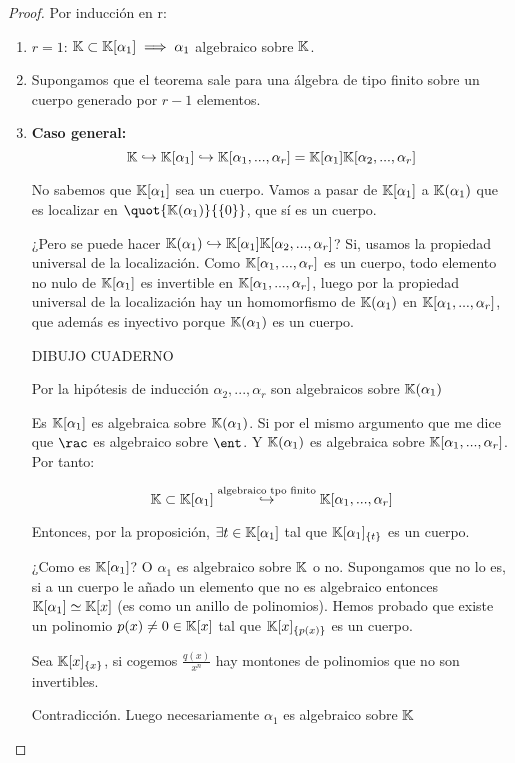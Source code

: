 \begin{proof}
	Por inducción en r:
	\begin{enumerate}
		\item $r=1$: $\mathbb{K} \subset \mathbb{K}[\alpha_1] \implies \alpha_1$ algebraico sobre $\mathbb{K}$.
		\item Supongamos que el teorema sale para una álgebra de tipo finito sobre un cuerpo generado por $r-1$ elementos.
		\item \textbf{Caso general:}
		$$\mathbb{K} \hookrightarrow \mathbb{K}[\alpha_1] \hookrightarrow \mathbb{K}[\alpha_1,...,\alpha_r]=\mathbb{K}[\alpha_1]\mathbb{K}[\alpha_2,...,\alpha_r]$$
		
		No sabemos que $\mathbb{K}[\alpha_1]$ sea un cuerpo. Vamos a pasar de $\mathbb{K}[\alpha_1]$ a $\mathbb{K}(\alpha_1)$ que es localizar en $\quot{\K(\alpha_1)}{\{0\}}$, que sí es un cuerpo.
		
		¿Pero se puede hacer $\mathbb{K}(\alpha_1) \hookrightarrow \mathbb{K}[\alpha_1]\mathbb{K}[\alpha_2,...,\alpha_r]$?  Si, usamos la propiedad universal de la localización. Como $\mathbb{K}[\alpha_1,...,\alpha_r]$ es un cuerpo, todo elemento no nulo de $\mathbb{K}[\alpha_1]$ es invertible en $\mathbb{K}[\alpha_1,...,\alpha_r]$, luego por la propiedad universal de la localización hay un homomorfismo de $\mathbb{K}(\alpha_1)$ en $\mathbb{K}[\alpha_1,...,\alpha_r]$, que además es inyectivo porque $\mathbb{K}(\alpha_1)$ es un cuerpo.
		
		DIBUJO CUADERNO
		
		Por la hipótesis de inducción $\alpha_2,...,\alpha_r$ son algebraicos sobre $\mathbb{K}(\alpha_1)$
		
		Es $\mathbb{K}[\alpha_1]$ es algebraica sobre $\mathbb{K}(\alpha_1)$.  Si por el mismo argumento que me dice que $\rac$ es algebraico sobre $\ent$. Y $\mathbb{K}(\alpha_1)$ es algebraica sobre $\mathbb{K}[\alpha_1,...,\alpha_r]$. Por tanto:
		
		$$ \mathbb{K} \subset \mathbb{K}[\alpha_1] \stackrel{\text{algebraico tpo finito}}{\hookrightarrow} \mathbb{K}[\alpha_1,...,\alpha_r]$$
		
		Entonces, por la proposición, $\exists t \in \mathbb{K}[\alpha_1]$ tal que $\mathbb{K}[\alpha_1]_{\{t\}}$ es un cuerpo.
		
		¿Como es $\mathbb{K}[\alpha_1]$? O $\alpha_1$ es algebraico sobre $\mathbb{K}$ o no. Supongamos que no lo es, si a un cuerpo le añado un elemento que no es algebraico entonces $\mathbb{K}[\alpha_1] \simeq \mathbb{K}[x]$ (es como un anillo de polinomios). Hemos probado que existe un polinomio $p(x)\neq 0 \in \mathbb{K}[x]$ tal que $\mathbb{K}[x]_{\{p(x)\}}$ es un cuerpo.
		
		\begin{example}
			Sea $\mathbb{K}[x]_{\{x\}}$, si cogemos $\frac{q(x)}{x^n}$ hay montones de polinomios que no son invertibles.
		\end{example}
		
		Contradicción. Luego necesariamente $\alpha_1$ es algebraico sobre $\mathbb{K}$
	\end{enumerate}
\end{proof}

